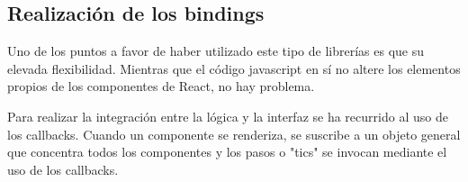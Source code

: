 \subsection{Realización de los bindings}
Uno de los puntos a favor de haber utilizado este tipo de librerías es que su elevada flexibilidad.
Mientras que el código javascript en sí no altere los elementos propios de los componentes de React, 
no hay problema.

\bigskip
Para realizar la integración entre la lógica y la interfaz se ha recurrido al uso de los callbacks.
Cuando un componente se renderiza, se suscribe a un objeto general que concentra todos los componentes
y los pasos o "tics" se invocan mediante el uso de los callbacks.
